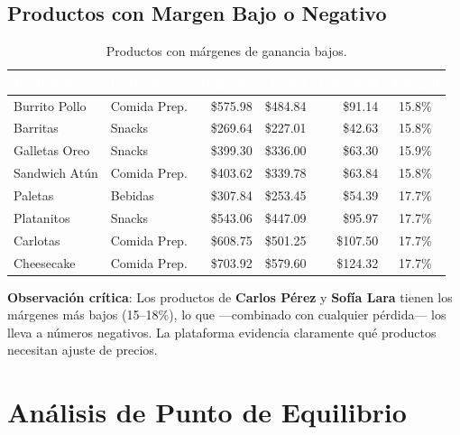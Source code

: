 \documentclass[12pt,letterpaper]{article}
\begin{document}
\subsection{Productos con Margen Bajo o Negativo}

\begin{table}[H]
\centering
\footnotesize
{}
\begin{tabular}{l l r r r c}
\toprule
\rowcolor{tabheader}
\textcolor{white}{\textbf{Producto}} &
\textcolor{white}{\textbf{Categoría}} &
\textcolor{white}{\textbf{Ingresos}} &
\textcolor{white}{\textbf{Costo}} &
\textcolor{white}{\textbf{Ganancia}} &
\textcolor{white}{\textbf{Margen}} \\
\midrule
Burrito Pollo   & Comida Prep. & \$575.98  & \$484.84 & \$91.14  & 15.8\% \\
Barritas        & Snacks       & \$269.64  & \$227.01 & \$42.63  & 15.8\% \\
Galletas Oreo   & Snacks       & \$399.30  & \$336.00 & \$63.30  & 15.9\% \\
Sandwich Atún   & Comida Prep. & \$403.62  & \$339.78 & \$63.84  & 15.8\% \\
Paletas         & Bebidas      & \$307.84  & \$253.45 & \$54.39  & 17.7\% \\
Platanitos      & Snacks       & \$543.06  & \$447.09 & \$95.97  & 17.7\% \\
Carlotas        & Comida Prep. & \$608.75  & \$501.25 & \$107.50 & 17.7\% \\
Cheesecake      & Comida Prep. & \$703.92  & \$579.60 & \$124.32 & 17.7\% \\
\bottomrule
\end{tabular}
\caption{Productos con márgenes de ganancia bajos.}
\end{table}

\textbf{Observación crítica}: Los productos de \textbf{Carlos Pérez} y \textbf{Sofía Lara} tienen los márgenes más bajos (15--18\%), lo que ---combinado con cualquier pérdida--- los lleva a números negativos. La plataforma evidencia claramente qué productos necesitan ajuste de precios.

\newpage
\section{Análisis de Punto de Equilibrio}
\end{document}
